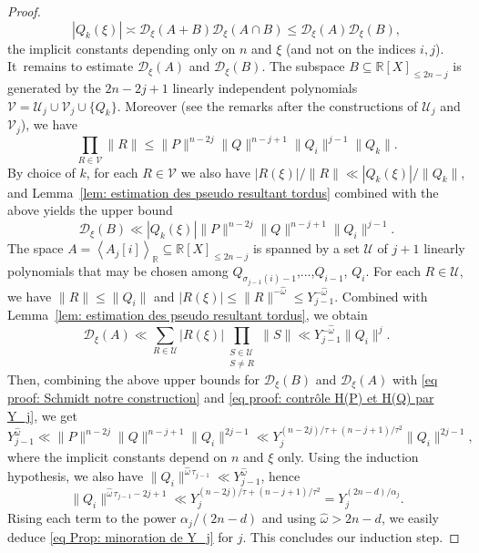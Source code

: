 \documentclass[JEP,XML,SOM,Unicode,NoFloatCountersInSection,published]{cedram}
\newcommand\bR{\mathbb{R}}
\newcommand\cU{\mathcal{U}}
\newcommand\cV{\mathcal{V}}
\newcommand\homega{\widehat{\omega}}\newcommand\HH{\mathcal{H}}
\newcommand\HHstar{\mathcal{D}_{\xi}}
\newcommand{\normH}[1]{\|#1\|}
\newcommand{\Vect}[2][]{\left\la #2\right\ra_{#1}}
\let\subset \subseteq
\let\la\langle
\let\ra\rangle
\theoremstyle{definition}
\theoremstyle{plain}
\begin{document}
\begin{proof}
\begin{equation}
\label{eq proof: Schmidt notre construction}
|Q_{k}(\xi)| \asymp \HHstar(A+B)\HHstar(A\cap B) \leq \HHstar(A) \HHstar(B),
\end{equation}
the implicit constants depending only on $n$ and $\xi$ (and not on the indices $i,j$). It~\hbox{remains} to estimate $\HHstar(A)$ and $\HHstar(B)$. The subspace $B\subset\bR[X]_{\leq 2n-j}$ is generated by the $2n-2j+1$ linearly independent polynomials $\cV = \cU_j \cup \cV_j \cup \{Q_k\}$. Moreover (see the remarks after the constructions of $\cU_j$ and $\cV_j$), we have
\[
\prod_{R\in\cV}\normH{R} \leq \normH{P}^{n-2j}\normH{Q}^{n-j+1}\normH{Q_i}^{j-1}\normH{Q_k}.
\]
By choice of $k$, for each $R\in\cV$ we also have $|R(\xi)|/\normH{R}\ll |Q_k(\xi)|/\normH{Q_k}$, and Lemma~\ref{lem: estimation des pseudo resultant tordus} combined with the above yields the upper bound
\begin{equation*}
\HHstar(B) \ll |Q_k(\xi)| \normH{P}^{n-2j}\normH{Q}^{n-j+1}\normH{Q_i}^{j-1}.
\end{equation*}
The space $A = \Vect[\bR]{A_j[i]}\subset\bR[X]_{\leq 2n-j}$ is spanned by a set $\cU$ of $j+1$ linearly polynomials that may be chosen among $Q_{\sigma_{j-1}(i)-1}$,...,$Q_{i-1}$, $Q_i$. For each $R\in\cU$, we have $\normH{R}\leq \normH{Q_i}$ and $|R(\xi)| \leq \normH{R}^{-\homega} \leq Y_{j-1}^{-\homega}$. Combined with Lemma~\ref{lem: estimation des pseudo resultant tordus}, we obtain
\begin{equation*}
\HHstar(A) \ll \sum_{R\in\cU}|R(\xi)|\prod_{\substack{S\in\cU \\ S\neq R}}\normH{S} \ll Y_{j-1}^{-\homega}\normH{Q_{i}}^j.
\end{equation*}
Then, combining the above upper bounds for $\HHstar(B)$ and $\HHstar(A)$ with \eqref{eq proof: Schmidt notre construction} and \eqref{eq proof: contrôle H(P) et H(Q) par Y_j}, we get
\begin{equation*}
Y_{j-1}^{\homega} \ll \normH{P}^{n-2j}\normH{Q}^{n-j+1}\normH{Q_i}^{2j-1} \ll Y_j^{(n-2j)/\tau + (n-j+1)/\tau^2}\normH{Q_i}^{2j-1},
\end{equation*}
where the implicit constants depend on $n$ and $\xi$ only. Using the induction hypothesis, we also have $\normH{Q_i}^{\homega\,\tau_{j-1}} \ll Y_{j-1}^{\homega}$, hence
\begin{equation*}
\normH{Q_i}^{\homega\,\tau_{j-1}-2j+1} \ll Y_j^{(n-2j)/\tau + (n-j+1)/\tau^2} = Y_j^{(2n-d)/\alpha_j}.
\end{equation*}
Rising each term to the power $\alpha_j/(2n-d)$ and using $\homega > 2n-d$, we easily deduce \eqref{eq Prop: minoration de Y_j} for $j$. This concludes our induction step.
\end{proof}
\end{document}
